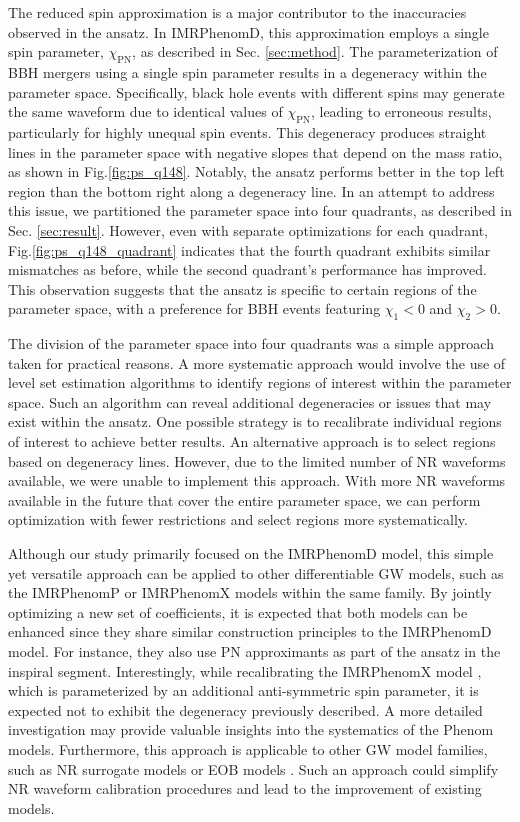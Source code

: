 \documentclass[twocolumn]{aastex631}
\begin{document}
The reduced spin approximation is a major contributor to the inaccuracies
observed in the ansatz. In IMRPhenomD, this approximation employs a single spin
parameter, $\chi_{\mathrm{PN}}$, as described in Sec. \ref{sec:method}. The
parameterization of BBH mergers using a single spin parameter results in a
degeneracy within the parameter space. Specifically, black hole events with
different spins may generate the same waveform due to identical values of
$\chi_{\mathrm{PN}}$, leading to erroneous results, particularly for highly
unequal spin events. This degeneracy produces straight lines in the parameter
space with negative slopes that depend on the mass ratio, as shown in
Fig.\ref{fig:ps_q148}. Notably, the ansatz performs better in the top left
region than the bottom right along a degeneracy line. In an attempt to address
this issue, we partitioned the parameter space into four quadrants, as described
in Sec. \ref{sec:result}. However, even with separate optimizations for each
quadrant, Fig.\ref{fig:ps_q148_quadrant} indicates that the fourth quadrant
exhibits similar mismatches as before, while the second quadrant's performance
has improved. This observation suggests that the ansatz is specific to certain
regions of the parameter space, with a preference for BBH events featuring
$\chi_1<0$ and $\chi_2>0$.

The division of the parameter space into four quadrants was a simple approach
taken for practical reasons. A more systematic approach would involve the use of
level set estimation algorithms to identify regions of interest within the
parameter space. Such an algorithm can reveal additional degeneracies or issues
that may exist within the ansatz. One possible strategy is to recalibrate
individual regions of interest to achieve better results. An alternative
approach is to select regions based on degeneracy lines. However, due to the
limited number of NR waveforms available, we were unable to implement this
approach. With more NR waveforms available in the future that cover the entire
parameter space, we can perform optimization with fewer restrictions and select
regions more systematically.

Although our study primarily focused on the IMRPhenomD model, this simple yet
versatile approach can be applied to other differentiable GW models, such as the
IMRPhenomP \citep{hannam2014simple} or IMRPhenomX \citep{pratten2020setting} 
models within the same family. By jointly optimizing a new set of coefficients,
it is expected that both models can be enhanced since they share similar
construction principles to the IMRPhenomD model. For instance, they also use PN
approximants as part of the ansatz in the inspiral segment. Interestingly, while
recalibrating the IMRPhenomX model \citep{pratten2020setting}, which is
parameterized by an additional anti-symmetric spin parameter, it is expected not
to exhibit the degeneracy previously described. A more detailed investigation
may provide valuable insights into the systematics of the Phenom models.
Furthermore, this approach is applicable to other GW model families, such as NR
surrogate models \citep{varma2019surrogate} or EOB models
\citep{taracchini2014effective}. Such an approach could simplify NR waveform
calibration procedures and lead to the improvement of existing models.
\end{document}
